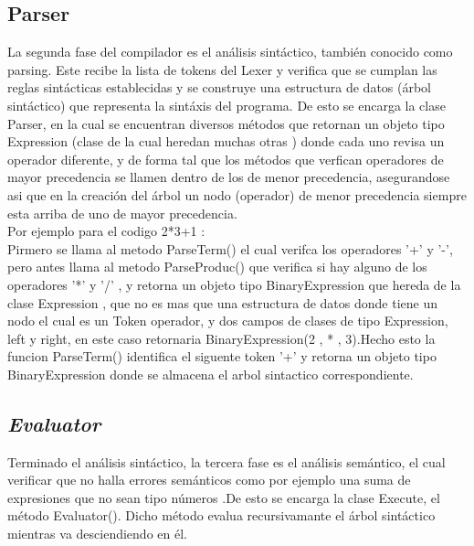 \documentclass[12pt]{article}
\begin{document}
	\subsection{{Parser}}
	La segunda fase del compilador es el análisis sintáctico, también conocido como parsing. Este recibe la lista de tokens del Lexer y verifica que se cumplan las reglas sintácticas establecidas y se construye una estructura de datos (árbol sintáctico) que representa la sintáxis del programa. De esto se encarga la clase Parser, en la cual se encuentran diversos métodos que retornan un objeto tipo Expression (clase de la cual heredan muchas otras ) donde cada uno revisa un operador diferente, y de forma tal que los métodos que verfican operadores de mayor precedencia se llamen dentro de los de menor precedencia, asegurandose asi que en la creación del árbol un nodo (operador) de menor precedencia siempre esta arriba de uno de mayor precedencia.\\
	Por ejemplo para el codigo 2*3+1 :\\
	Pirmero se llama al metodo ParseTerm()  el cual verifca los operadores '+' y '-', pero antes llama al metodo ParseProduc() que verifica si hay alguno de los operadores '*' y '/' , y retorna un objeto tipo BinaryExpression que hereda de la clase Expression , que no es mas que una estructura de datos donde tiene un nodo el cual es un Token operador, y dos campos de clases de tipo Expression, left y right, en este caso retornaria BinaryExpression(2 , * , 3).Hecho  esto la funcion ParseTerm() identifica el siguente token '+' y retorna un objeto tipo BinaryExpression donde se almacena el arbol sintactico correspondiente.
	
	
	\subsection{\textit{Evaluator}}
		Terminado el análisis sintáctico, la tercera fase es el análisis semántico, el cual verificar que no halla errores semánticos como por ejemplo una suma de expresiones que no sean tipo números  .De esto se encarga la clase Execute, el método Evaluator(). Dicho método evalua recursivamante el árbol sintáctico mientras va  desciendiendo en él.
	

	

	
	
\end{document}
